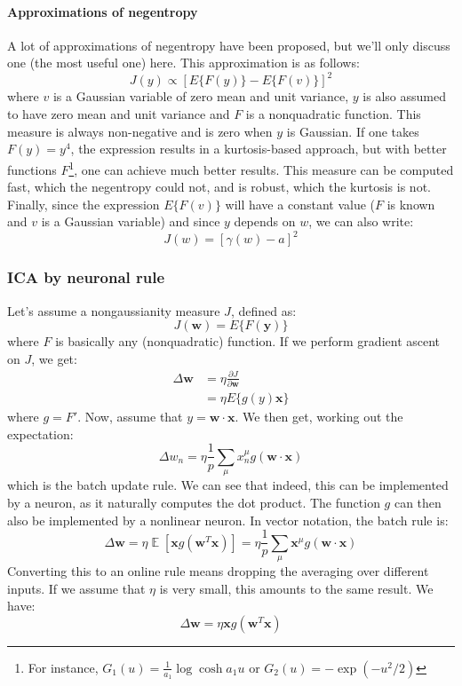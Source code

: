 \documentclass[11pt]{article}
\DeclareMathOperator{\E}{\mathbb{E}}
\begin{document}
\paragraph{Approximations of negentropy}
A lot of approximations of negentropy have been proposed, but we'll only discuss one (the most useful one) here. This approximation is as follows:
\[J(y) \propto [E\{F(y)\} - E\{F(v)\}]^2\]
where $v$ is a Gaussian variable of zero mean and unit variance, $y$ is also assumed to have zero mean and unit variance and $F$ is a nonquadratic function. This measure is always non-negative and is zero when $y$ is Gaussian.
If one takes $F(y) = y^4$, the expression results in a kurtosis-based approach, but with better functions $F$\footnote{For instance, $G_1(u) = \frac{1}{a_1}\log\cosh a_1 u$ or $G_2(u)=-\exp(-u^2/2)$}, one can achieve much better results. This measure can be computed fast, which the negentropy could not, and is robust, which the kurtosis is not.\\
Finally, since the expression $E\{F(v)\}$ will have a constant value ($F$ is known and $v$ is a Gaussian variable) and since $y$ depends on $w$, we can also write:
\[J(w) = [\gamma(w) - a]^2\]


\subsubsection{ICA by neuronal rule}
Let's assume a nongaussianity measure $J$, defined as:
\[J(\mathbf{w}) = E\{F(\mathbf{y})\}\]
where $F$ is basically any (nonquadratic) function. If we perform gradient ascent on $J$, we get:
\begin{align*}
\Delta\mathbf{w} &= \eta\frac{\partial J}{\partial\mathbf{w}}\\
&= \eta E\{g(y)\mathbf{x}\}
\end{align*}
where $g = F'$. Now, assume that $y = \mathbf{w}\cdot\mathbf{x}$. We then get, working out the expectation:
\[ \Delta w_n = \eta\frac{1}{p} \sum_\mu x_n^\mu g(\mathbf{w}\cdot\mathbf{x})\]
which is the batch update rule. We can see that indeed, this can be implemented by a neuron, as it naturally computes the dot product. The function $g$ can then also be implemented by a nonlinear neuron. In vector notation, the batch rule is:
\[
\Delta \mathbf{w}=\eta\E\left[\mathbf{x}g(\mathbf{w}^T\mathbf{x})\right] = \eta\frac{1}{p} \sum_\mu \mathbf{x}^\mu g(\mathbf{w}\cdot\mathbf{x})
\]
Converting this to an online rule means dropping the averaging over different inputs. If we assume that $\eta$ is very small, this amounts to the same result. We have:
\[
\Delta \mathbf{w}=\eta \mathbf{x} g(\mathbf{w}^T\mathbf{x})
\]
\end{document}
